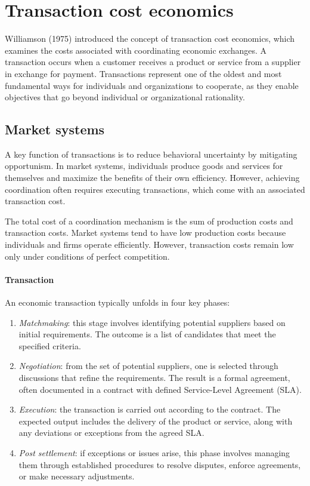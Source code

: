 \section{Transaction cost economics}

Williamson (1975) introduced the concept of transaction cost economics, which examines the costs associated with coordinating economic exchanges. 
A transaction occurs when a customer receives a product or service from a supplier in exchange for payment. 
Transactions represent one of the oldest and most fundamental ways for individuals and organizations to cooperate, as they enable objectives that go beyond individual or organizational rationality.

\subsection{Market systems}
A key function of transactions is to reduce behavioral uncertainty by mitigating opportunism. 
In market systems, individuals produce goods and services for themselves and maximize the benefits of their own efficiency. 
However, achieving coordination often requires executing transactions, which come with an associated transaction cost.

The total cost of a coordination mechanism is the sum of production costs and transaction costs. 
Market systems tend to have low production costs because individuals and firms operate efficiently. 
However, transaction costs remain low only under conditions of perfect competition.

\paragraph*{Transaction}
An economic transaction typically unfolds in four key phases:
\begin{enumerate}
    \item \textit{Matchmaking}: this stage involves identifying potential suppliers based on initial requirements. 
        The outcome is a list of candidates that meet the specified criteria.
    \item \textit{Negotiation}: from the set of potential suppliers, one is selected through discussions that refine the requirements. 
        The result is a formal agreement, often documented in a contract with defined Service-Level Agreement (SLA).
    \item \textit{Execution}: the transaction is carried out according to the contract. 
        The expected output includes the delivery of the product or service, along with any deviations or exceptions from the agreed SLA.
    \item \textit{Post settlement}: if exceptions or issues arise, this phase involves managing them through established procedures to resolve disputes, enforce agreements, or make necessary adjustments.
\end{enumerate}


